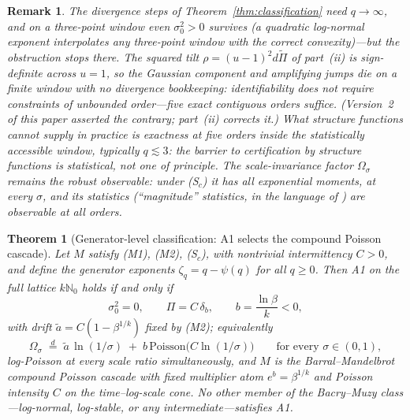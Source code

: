 \documentclass[pdflatex,sn-mathphys-num]{sn-jnl}
\theoremstyle{thmstyleone}
\newtheorem{theorem}{Theorem}
\theoremstyle{thmstyletwo}
\newtheorem*{remark}{Remark}
\theoremstyle{thmstylethree}
\begin{document}
\begin{remark}
The divergence steps of Theorem~\ref{thm:classification} need $q
\to \infty$, and on a three-point window even $\sigma_0^2 > 0$
survives (a quadratic log-normal exponent interpolates any
three-point window with the correct convexity)---but the
obstruction stops there.  The squared tilt $\rho = (u-1)^2
d\tilde\Pi$ of part~(ii) is sign-definite across $u = 1$, so the
Gaussian component and amplifying jumps die on a finite window with
no divergence bookkeeping: identifiability does \emph{not} require
constraints of unbounded order---five exact contiguous orders
suffice.  (Version~2 of this paper asserted the contrary; part~(ii)
corrects it.)  What structure
functions cannot supply in practice is exactness at five orders
inside the statistically accessible window, typically $q \lesssim
3$: the
barrier to certification by structure functions is statistical, not
one of principle.  The scale-invariance factor $\Omega_\sigma$
remains the robust observable: under \textup{(S$_c$)} it has all
exponential moments, at every $\sigma$, and its statistics
(``magnitude'' statistics, in the language of \cite{DMA01}) are
observable at all orders.
\end{remark}

\begin{theorem}[Generator-level classification: A1 selects the
compound Poisson cascade]\label{thm:cpc}
Let $M$ satisfy \textup{(M1)}, \textup{(M2)}, \textup{(S$_c$)}, with
nontrivial intermittency $C > 0$, and define the generator
exponents $\zeta_q = q - \psi(q)$ for all $q \ge 0$.  Then A1 on the
full lattice $k\mathbb{N}_0$ holds if and only if
\[
  \sigma_0^2 = 0, \qquad \Pi = C\,\delta_b, \qquad
  b = \frac{\ln\beta}{k} < 0,
\]
with drift $\tilde a = C(1-\beta^{1/k})$ fixed by \textup{(M2)};
equivalently
\[
  \Omega_\sigma \;\stackrel{d}{=}\;
  \tilde a\,\ln(1/\sigma) \;+\; b\,\mathrm{Poisson}\bigl(C
  \ln(1/\sigma)\bigr)
  \qquad\text{for every } \sigma \in (0,1),
\]
log-Poisson at every scale ratio simultaneously, and $M$ is the
Barral--Mandelbrot compound Poisson cascade \cite{BM02} with fixed
multiplier atom $e^b = \beta^{1/k}$ and Poisson intensity $C$ on the
time--log-scale cone.  No other member of the Bacry--Muzy
class---log-normal, log-stable, or any intermediate---satisfies A1.
\end{theorem}
\end{document}
